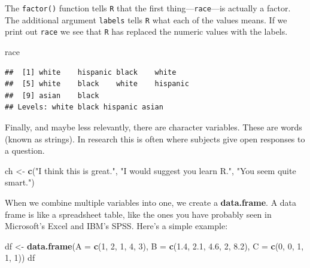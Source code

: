 \documentclass[]{tufte-book}
\newenvironment{Shaded}{}{}
\newcommand{\KeywordTok}[1]{\textcolor[rgb]{0.00,0.44,0.13}{\textbf{#1}}}
\newcommand{\DataTypeTok}[1]{\textcolor[rgb]{0.56,0.13,0.00}{#1}}
\newcommand{\DecValTok}[1]{\textcolor[rgb]{0.25,0.63,0.44}{#1}}
\newcommand{\FloatTok}[1]{\textcolor[rgb]{0.25,0.63,0.44}{#1}}
\newcommand{\StringTok}[1]{\textcolor[rgb]{0.25,0.44,0.63}{#1}}
\newcommand{\NormalTok}[1]{#1}
\theoremstyle{definition}
\theoremstyle{definition}
\theoremstyle{remark}
\begin{document}
The \texttt{factor()} function tells \texttt{R} that the first
thing---\texttt{race}---is actually a factor. The additional argument
\texttt{labels} tells \texttt{R} what each of the values means. If we
print out \texttt{race} we see that \texttt{R} has replaced the numeric
values with the labels.

\begin{Shaded}
\begin{Highlighting}[]
\NormalTok{race}
\end{Highlighting}
\end{Shaded}

\begin{verbatim}
##  [1] white    hispanic black    white   
##  [5] white    black    white    hispanic
##  [9] asian    black   
## Levels: white black hispanic asian
\end{verbatim}

Finally, and maybe less relevantly, there are character variables. These
are words (known as strings). In research this is often where subjects
give open responses to a question.

\begin{Shaded}
\begin{Highlighting}[]
\NormalTok{ch <-}\StringTok{ }\KeywordTok{c}\NormalTok{(}\StringTok{"I think this is great."}\NormalTok{, }\StringTok{"I would suggest you learn R."}\NormalTok{, }
    \StringTok{"You seem quite smart."}\NormalTok{)}
\end{Highlighting}
\end{Shaded}

When we combine multiple variables into one, we create a
\textbf{data.frame}. A data frame is like a spreadsheet table, like the
ones you have probably seen in Microsoft's Excel and IBM's SPSS. Here's
a simple example:

\begin{Shaded}
\begin{Highlighting}[]
\NormalTok{df <-}\StringTok{ }\KeywordTok{data.frame}\NormalTok{(}\DataTypeTok{A =} \KeywordTok{c}\NormalTok{(}\DecValTok{1}\NormalTok{, }\DecValTok{2}\NormalTok{, }\DecValTok{1}\NormalTok{, }\DecValTok{4}\NormalTok{, }\DecValTok{3}\NormalTok{), }\DataTypeTok{B =} \KeywordTok{c}\NormalTok{(}\FloatTok{1.4}\NormalTok{, }
    \FloatTok{2.1}\NormalTok{, }\FloatTok{4.6}\NormalTok{, }\DecValTok{2}\NormalTok{, }\FloatTok{8.2}\NormalTok{), }\DataTypeTok{C =} \KeywordTok{c}\NormalTok{(}\DecValTok{0}\NormalTok{, }\DecValTok{0}\NormalTok{, }\DecValTok{1}\NormalTok{, }\DecValTok{1}\NormalTok{, }\DecValTok{1}\NormalTok{))}
\NormalTok{df}
\end{Highlighting}
\end{Shaded}
\end{document}
